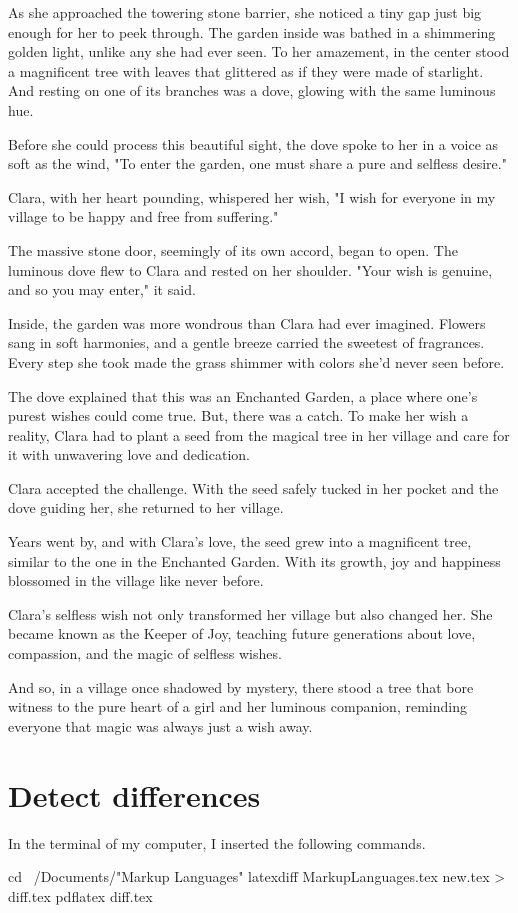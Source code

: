 \documentclass[10pt, a4paper, titlepage]{article} %
\begin{document}
As she approached the towering stone barrier, she noticed a tiny gap just big enough for her to peek through. The garden inside was bathed in a shimmering golden light, unlike any she had ever seen. To her amazement, in the center stood a magnificent tree with leaves that glittered as if they were made of starlight. And resting on one of its branches was a dove, glowing with the same luminous hue.

Before she could process this beautiful sight, the dove spoke to her in a voice as soft as the wind, "To enter the garden, one must share a pure and selfless desire."

Clara, with her heart pounding, whispered her wish, "I wish for everyone in my village to be happy and free from suffering."

The massive stone door, seemingly of its own accord, began to open. The luminous dove flew to Clara and rested on her shoulder. "Your wish is genuine, and so you may enter," it said.

Inside, the garden was more wondrous than Clara had ever imagined. Flowers sang in soft harmonies, and a gentle breeze carried the sweetest of fragrances. Every step she took made the grass shimmer with colors she'd never seen before.

The dove explained that this was an Enchanted Garden, a place where one’s purest wishes could come true. But, there was a catch. To make her wish a reality, Clara had to plant a seed from the magical tree in her village and care for it with unwavering love and dedication.

Clara accepted the challenge. With the seed safely tucked in her pocket and the dove guiding her, she returned to her village.

Years went by, and with Clara's love, the seed grew into a magnificent tree, similar to the one in the Enchanted Garden. With its growth, joy and happiness blossomed in the village like never before.

Clara's selfless wish not only transformed her village but also changed her. She became known as the Keeper of Joy, teaching future generations about love, compassion, and the magic of selfless wishes.

And so, in a village once shadowed by mystery, there stood a tree that bore witness to the pure heart of a girl and her luminous companion, reminding everyone that magic was always just a wish away.

\section{Detect differences}

In the terminal of my computer, I inserted the following commands.

cd ~/Documents/"Markup Languages"
latexdiff MarkupLanguages.tex new.tex > diff.tex
pdflatex diff.tex
\end{document}
